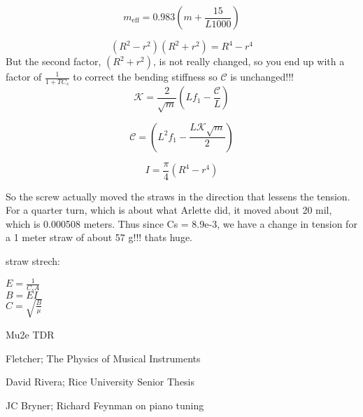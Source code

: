 \documentclass[twoside]{article}
\begin{document}
\begin{multicols}{2}
\begin{equation}
m_\text{eff} = 0.983(m + \frac{15}{L 1000}) 
\end{equation}



\begin{equation}
(R^2 - r^2)(R^2 + r^2) = R^4 - r^4
\end{equation}
But the second factor, $(R^2 + r^2)$, is not really changed, so you end up with a factor of $\frac{1}{1 + TC_s}$ to correct the bending stiffness so $\mathcal{C}$ is unchanged!!!
\begin{equation}
\mathcal{K} = \frac{2}{\sqrt{m}} (Lf_1 - \frac{\mathcal{C}}{L})
\end{equation}

\begin{equation}
\mathcal{C} =  (L^2 f_1 - \frac{L\mathcal{K}\sqrt{m}}{2} )
\end{equation}


\begin{equation}
I = \frac{\pi}{4}(R^4 - r^4)
\end{equation}

So the screw actually moved the straws in the direction that lessens the tension.  For a quarter turn, which is about what Arlette did, it moved about 20 mil, which is 0.000508 meters. Thus since Cs = 8.9e-3, we have a change in tension for a 1 meter straw of about 57 g!!! thats huge.

straw strech:

$E = \frac{1}{C_s A}$ \\
$B = E I$ \\
$C = \sqrt{\frac{B}{\mu}}$


\begin{thebibliography}{99} %

Mu2e TDR 

Fletcher; The Physics of Musical Instruments

David Rivera; Rice University Senior Thesis

JC Bryner;  Richard Feynman on piano tuning




\end{thebibliography}


\end{multicols}
\end{document}
